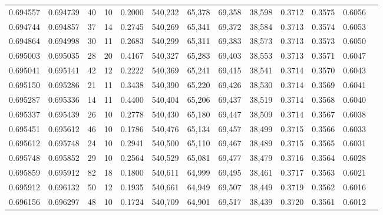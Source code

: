 \begin{tabular}{rrrrrrrrrrrrr}
0.694557 & 0.694739 &    40 &  10 &                                     0.2000 & 540,232 &  65,378 &  69,358 &  38,598 & 0.3712 & 0.3575 & 0.6056 \\
0.694744 & 0.694857 &    37 &  14 &                                     0.2745 & 540,269 &  65,341 &  69,372 &  38,584 & 0.3713 & 0.3574 & 0.6053 \\
0.694864 & 0.694998 &    30 &  11 &                                     0.2683 & 540,299 &  65,311 &  69,383 &  38,573 & 0.3713 & 0.3573 & 0.6050 \\
0.695003 & 0.695035 &    28 &  20 &                                     0.4167 & 540,327 &  65,283 &  69,403 &  38,553 & 0.3713 & 0.3571 & 0.6047 \\
0.695041 & 0.695141 &    42 &  12 &                                     0.2222 & 540,369 &  65,241 &  69,415 &  38,541 & 0.3714 & 0.3570 & 0.6043 \\
0.695150 & 0.695286 &    21 &  11 &                                     0.3438 & 540,390 &  65,220 &  69,426 &  38,530 & 0.3714 & 0.3569 & 0.6041 \\
0.695287 & 0.695336 &    14 &  11 &                                     0.4400 & 540,404 &  65,206 &  69,437 &  38,519 & 0.3714 & 0.3568 & 0.6040 \\
0.695337 & 0.695439 &    26 &  10 &                                     0.2778 & 540,430 &  65,180 &  69,447 &  38,509 & 0.3714 & 0.3567 & 0.6038 \\
0.695451 & 0.695612 &    46 &  10 &                                     0.1786 & 540,476 &  65,134 &  69,457 &  38,499 & 0.3715 & 0.3566 & 0.6033 \\
0.695612 & 0.695748 &    24 &  10 &                                     0.2941 & 540,500 &  65,110 &  69,467 &  38,489 & 0.3715 & 0.3565 & 0.6031 \\
0.695748 & 0.695852 &    29 &  10 &                                     0.2564 & 540,529 &  65,081 &  69,477 &  38,479 & 0.3716 & 0.3564 & 0.6028 \\
0.695859 & 0.695912 &    82 &  18 &                                     0.1800 & 540,611 &  64,999 &  69,495 &  38,461 & 0.3717 & 0.3563 & 0.6021 \\
0.695912 & 0.696132 &    50 &  12 &                                     0.1935 & 540,661 &  64,949 &  69,507 &  38,449 & 0.3719 & 0.3562 & 0.6016 \\
0.696156 & 0.696297 &    48 &  10 &                                     0.1724 & 540,709 &  64,901 &  69,517 &  38,439 & 0.3720 & 0.3561 & 0.6012 \\

\end{tabular}
